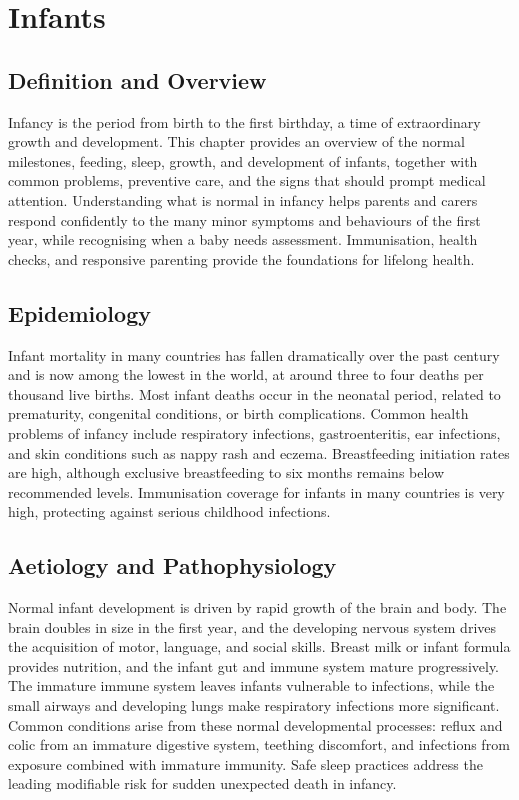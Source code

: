 \chapter{Infants}

\section*{Definition and Overview}
Infancy is the period from birth to the first birthday, a time of extraordinary growth and development. This chapter provides an overview of the normal milestones, feeding, sleep, growth, and development of infants, together with common problems, preventive care, and the signs that should prompt medical attention. Understanding what is normal in infancy helps parents and carers respond confidently to the many minor symptoms and behaviours of the first year, while recognising when a baby needs assessment. Immunisation, health checks, and responsive parenting provide the foundations for lifelong health.

\section*{Epidemiology}
Infant mortality in many countries has fallen dramatically over the past century and is now among the lowest in the world, at around three to four deaths per thousand live births. Most infant deaths occur in the neonatal period, related to prematurity, congenital conditions, or birth complications. Common health problems of infancy include respiratory infections, gastroenteritis, ear infections, and skin conditions such as nappy rash and eczema. Breastfeeding initiation rates are high, although exclusive breastfeeding to six months remains below recommended levels. Immunisation coverage for infants in many countries is very high, protecting against serious childhood infections.

\section*{Aetiology and Pathophysiology}
Normal infant development is driven by rapid growth of the brain and body. The brain doubles in size in the first year, and the developing nervous system drives the acquisition of motor, language, and social skills. Breast milk or infant formula provides nutrition, and the infant gut and immune system mature progressively. The immature immune system leaves infants vulnerable to infections, while the small airways and developing lungs make respiratory infections more significant. Common conditions arise from these normal developmental processes: reflux and colic from an immature digestive system, teething discomfort, and infections from exposure combined with immature immunity. Safe sleep practices address the leading modifiable risk for sudden unexpected death in infancy.

